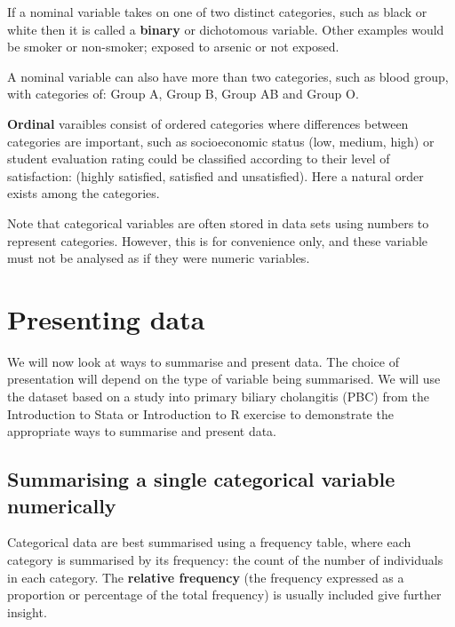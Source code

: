 \documentclass[
  a4paper,
]{memoir}
\begin{document}
If a nominal variable takes on one of two distinct categories, such as
black or white then it is called a \textbf{binary} or dichotomous
variable. Other examples would be smoker or non-smoker; exposed to
arsenic or not exposed.

A nominal variable can also have more than two categories, such as blood
group, with categories of: Group A, Group B, Group AB and Group O.

\textbf{Ordinal} varaibles consist of ordered categories where
differences between categories are important, such as socioeconomic
status (low, medium, high) or student evaluation rating could be
classified according to their level of satisfaction: (highly satisfied,
satisfied and unsatisfied). Here a natural order exists among the
categories.

Note that categorical variables are often stored in data sets using
numbers to represent categories. However, this is for convenience only,
and these variable must not be analysed as if they were numeric
variables.

\hypertarget{presenting-data}{%
\section{Presenting data}\label{presenting-data}}

We will now look at ways to summarise and present data. The choice of
presentation will depend on the type of variable being summarised. We
will use the dataset based on a study into primary biliary cholangitis
(PBC) from the Introduction to Stata or Introduction to R exercise to
demonstrate the appropriate ways to summarise and present data.

\hypertarget{summarising-a-single-categorical-variable-numerically}{%
\subsection{Summarising a single categorical variable
numerically}\label{summarising-a-single-categorical-variable-numerically}}

Categorical data are best summarised using a frequency table, where each
category is summarised by its frequency: the count of the number of
individuals in each category. The \textbf{relative frequency} (the
frequency expressed as a proportion or percentage of the total
frequency) is usually included give further insight.

\hypertarget{tbl-1-sex}{}
 
  \providecommand{\huxb}[2]{\arrayrulecolor[RGB]{#1}\global\arrayrulewidth=#2pt}
  \providecommand{\huxvb}[2]{\color[RGB]{#1}\vrule width #2pt}
  \providecommand{\huxtpad}[1]{\rule{0pt}{#1}}
  \providecommand{\huxbpad}[1]{\rule[-#1]{0pt}{#1}}
\end{document}
